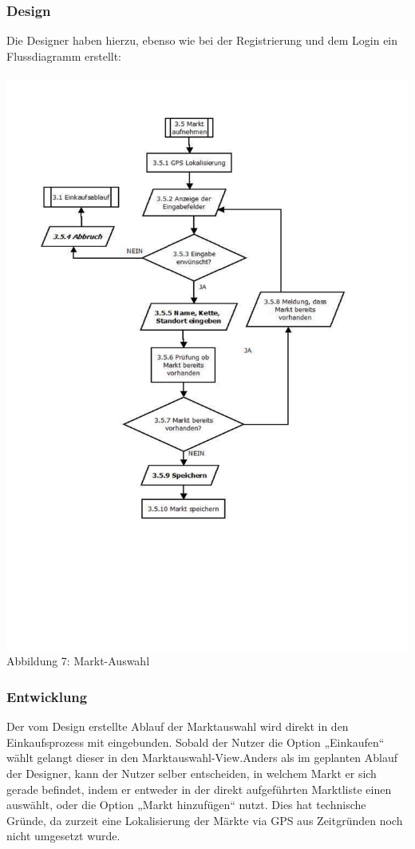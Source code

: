 \documentclass[12pt,a4paper]{article}
\begin{document}
\subsubsection*{Design}
Die Designer haben hierzu, ebenso wie bei der Registrierung und dem Login ein Flussdiagramm erstellt: 
\\
\\
\hspace*{-10mm} 
\includegraphics[trim = 17mm 40mm 0mm 20mm, clip, scale=0.9]{Markt-Aufnahme.pdf}
\\
\footnotesize Abbildung 7: Markt-Auswahl
\normalsize
\subsubsection*{Entwicklung}
Der vom Design erstellte Ablauf der Marktauswahl wird direkt in den Einkaufsprozess mit eingebunden. Sobald der Nutzer die Option „Einkaufen“ wählt gelangt dieser in den Marktauswahl-View.Anders als im geplanten Ablauf der Designer, kann der Nutzer selber entscheiden, in welchem Markt er sich gerade befindet, indem er entweder in der direkt aufgeführten Marktliste einen auswählt, oder die Option „Markt hinzufügen“ nutzt. Dies hat technische Gründe, da zurzeit eine Lokalisierung der Märkte via GPS aus Zeitgründen noch nicht umgesetzt wurde.
\newpage
\end{document}
